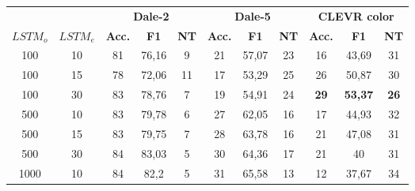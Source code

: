 \begin{table}[ht]
    \centering
    \begin{tabular}{cc|ccc|ccc|ccc}
        \toprule
                 &          & \multicolumn{3}{c}{\textbf{Dale-2}} & \multicolumn{3}{c}{\textbf{Dale-5}} & \multicolumn{3}{c}{\textbf{CLEVR color}}                                                                                               \\  \cmidrule(lr){3-5}\cmidrule(lr){6-8}\cmidrule(lr){9-11}
        $LSTM_o$ & $LSTM_e$ & \textbf{Acc.}                       & \textbf{F1}                         & \textbf{NT}                              & \textbf{Acc.} & \textbf{F1}    & \textbf{NT} & \textbf{Acc.} & \textbf{F1}    & \textbf{NT} \\\midrule
        {100}    & {10}     & {81}                                & {76,16}                             & {9}                                      & {21}          & {57,07}        & {23}        & {16}          & {43,69}        & {31}        \\
        {100}    & {15}     & {78}                                & {72,06}                             & {11}                                     & {17}          & {53,29}        & {25}        & {26}          & {50,87}        & {30}        \\
        {100}    & {30}     & {83}                                & {78,76}                             & {7}                                      & {19}          & {54,91}        & {24}        & \textbf{29}   & \textbf{53,37} & \textbf{26} \\
        {500}    & {10}     & {83}                                & {79,78}                             & {6}                                      & {27}          & {62,05}        & {16}        & {17}          & {44,93}        & {32}        \\
        {500}    & {15}     & {83}                                & {79,75}                             & {7}                                      & {28}          & {63,78}        & {16}        & {21}          & {47,08}        & {31}        \\
        {500}    & {30}     & {84}                                & {83,03}                             & {5}                                      & {30}          & {64,36}        & {17}        & {21}          & {40}           & {31}        \\
        {1000}   & {10}     & {84}                                & {82,2}                              & {5}                                      & {31}          & {65,58}        & {13}        & {12}          & {37,67}        & {34}        \\

\end{tabular}
\end{table}
